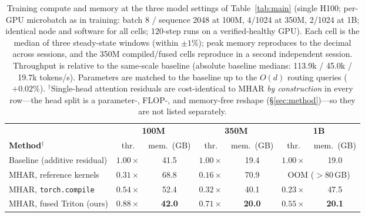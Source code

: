 \documentclass{article}
\begin{document}
\begin{table}[h]
\centering
\caption{Training compute and memory at the three model settings of
Table~\ref{tab:main} (single H100; per-GPU microbatch as in training: batch 8 /
sequence 2048 at 100M, 4/1024 at 350M, 2/1024 at 1B; identical node and software for
all cells; 120-step runs on a verified-healthy GPU). Each cell is the median of
three steady-state windows (within $\pm 1\%$); peak memory reproduces to the
decimal across sessions, and the 350M compiled/fused cells reproduce in a second
independent session. Throughput is relative to the same-scale baseline (absolute
baseline medians: 113.9k / 45.0k / 19.7k tokens/s). Parameters are matched to the baseline up to the $O(d)$ routing
queries ($+0.02\%$). $^{\dagger}$Single-head attention residuals are cost-identical
to MHAR \emph{by construction} in every row---the head split is a parameter-, FLOP-,
and memory-free reshape (\S\ref{sec:method})---so they are not listed separately.}
\label{tab:cost}
\small
\begin{tabular}{lcccccc}
\toprule
& \multicolumn{2}{c}{\textbf{100M}} & \multicolumn{2}{c}{\textbf{350M}} & \multicolumn{2}{c}{\textbf{1B}} \\
\cmidrule(lr){2-3}\cmidrule(lr){4-5}\cmidrule(lr){6-7}
\textbf{Method}$^{\dagger}$ & thr. & mem.\ (GB) & thr. & mem.\ (GB) & thr. & mem.\ (GB) \\
\midrule
Baseline (additive residual) & $1.00\times$ & 41.5 & $1.00\times$ & 19.4 & $1.00\times$ & 19.0 \\
MHAR, reference kernels      & $0.31\times$ & 68.8 & $0.16\times$ & 70.9 & \multicolumn{2}{c}{OOM ($>$80\,GB)} \\
MHAR, \texttt{torch.compile} & $0.54\times$ & 52.4 & $0.32\times$ & 40.1 & $0.23\times$ & 47.5 \\
MHAR, fused Triton (ours)    & $\mathbf{0.88\times}$ & \textbf{42.0} & $\mathbf{0.71\times}$ & \textbf{20.0} & $\mathbf{0.55\times}$ & \textbf{20.1} \\
\bottomrule
\end{tabular}
\end{table}
\end{document}
